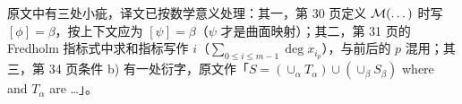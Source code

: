 \begin{yizhu}[原文的几处排印笔误]
原文中有三处小疵，译文已按数学意义处理：其一，第 30 页定义 $\mathcal{M}(\dots)$ 时写 $[\phi]=\beta$，按上下文应为 $[\psi]=\beta$（$\psi$ 才是曲面映射）；其二，第 31 页的 Fredholm 指标式中求和指标写作 $i$（$\sum_{0\le i\le m-1}\deg x_{i_p}$），与前后的 $p$ 混用；其三，第 34 页条件 b) 有一处衍字，原文作「$S=(\cup_\alpha T_\alpha)\cup(\cup_\beta S_\beta)$ where and $T_\alpha$ are \dots」。
\end{yizhu}

